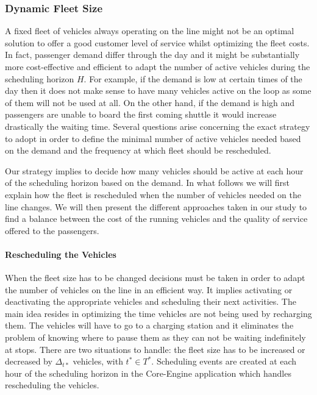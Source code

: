 \documentclass[12pt,a4paper]{article}
\begin{document}
\subsubsection{Dynamic Fleet Size}
A fixed fleet of vehicles always operating on the line might not be an optimal solution to offer a good customer level of service whilst optimizing the fleet costs. In fact, passenger demand differ through the day and it might be substantially more cost-effective and efficient to adapt the number of active vehicles during the scheduling horizon $H$. For example, if the demand is low at certain times of the day then it does not make sense to have many vehicles active on the loop as some of them will not be used at all. On the other hand, if the demand is high and passengers are unable to board the first coming shuttle it would increase drastically the waiting time. Several questions arise concerning the exact strategy to adopt in order to define the minimal number of active vehicles needed based on the demand and the frequency at which fleet should be rescheduled. 

Our strategy implies to decide how many vehicles should be active at each hour of the scheduling horizon based on the demand. In what follows we will first explain how the fleet is rescheduled when the number of vehicles needed on the line changes. We will then present the different approaches taken in our study to find a balance between the cost of the running vehicles and the quality of service offered to the passengers. 

\paragraph{Rescheduling the Vehicles} When the fleet size has to be changed decisions must be taken in order to adapt the number of vehicles on the line in an efficient way. It implies activating or deactivating the appropriate vehicles and scheduling their next activities. The main idea resides in optimizing the time vehicles are not being used by recharging them. The vehicles will have to go to a charging station and it eliminates the problem of knowing where to pause them as they can not be waiting indefinitely at stops. There are two situations to handle: the fleet size has to be increased or decreased by $\Delta_{t*}$ vehicles, with $t^{*} \in T^{*}$. Scheduling events are created at each hour of the scheduling horizon in the Core-Engine application which handles rescheduling the vehicles.
\end{document}
